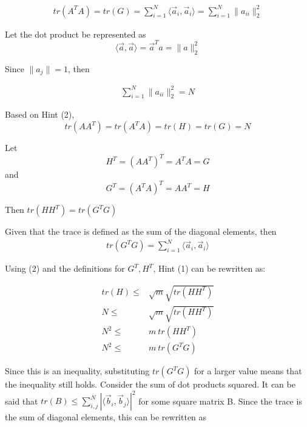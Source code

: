 \documentclass[11pt]{article}
\begin{document}
\begin{equation}
\begin{split}
tr(A^T A) = tr(G) = \sum_{i = 1}^{N} \langle \vec a_i, \vec a_i \rangle = \sum_{i = 1}^{N} \|a_{ii} \|_2^2
\end{split}
\end{equation}

Let the dot product be represented as $$\langle \vec a, \vec a \rangle = \vec a^T a = \| a \|_2^2$$

Since \(\| a_{j} \| = 1\), then

\begin{equation}
\begin{split}
\sum_{i = 1}^{N} \| a_{ii} \|_2^2 = N
\end{split}
\end{equation}

Based on Hint (2), $$tr(AA^T) = tr(A^T A) = tr(H) = tr(G) = N$$


Let $$H^T = (AA^T)^T = A^T A = G$$ and $$G^T = (A^T A)^T = AA^T = H$$

Then \(tr(HH^T) = tr(G^T G)\)

Given that the trace is defined as the sum of the diagonal elements, then
\begin{equation}
\begin{split}
tr(G^T G) = \sum_{i = 1}^{N} \langle \vec a_i, \vec a_i \rangle
\end{split}
\end{equation}



Using (2) and the definitions for \(G^T, H^T\), Hint (1) can be rewritten as:

\begin{equation}
\begin{split}
tr(H) \leq & \sqrt m \sqrt{tr(HH^T)}\\
N \leq & \sqrt m \sqrt{tr(HH^T)}\\
N^2 \leq & m \ tr(HH^T)\\
N^2 \leq & m \ tr(G^T G)
\end{split}
\end{equation}

Since this is an inequality, substituting \(tr(G^T G)\) for a larger value means
that the inequality still holds. Consider the sum of dot products squared. It
can be said that \(tr(B) \leq \sum_{i, j}^{N} | \langle \vec b_i, \vec b_j
\rangle |^2\) for some square matrix B. Since the trace is the sum of diagonal
elements, this can be rewritten as
\end{document}

